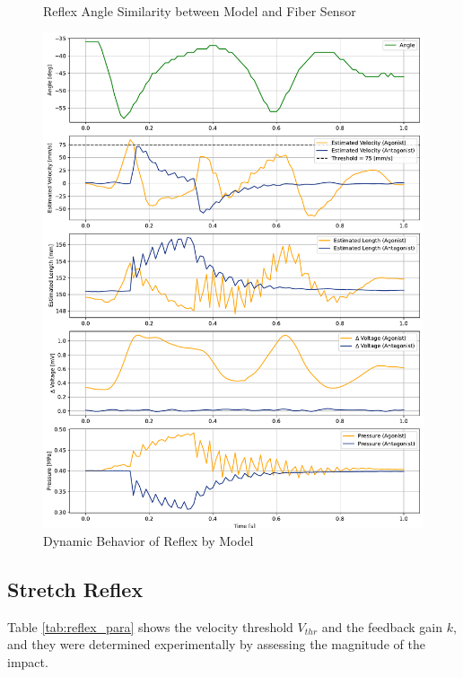 \begin{figure}[t]
\begin{minipage}[H]{\textwidth}
\begin{minipage}[H]{0.48\textwidth}
            \caption{Reflex Angle Similarity between Model and Fiber Sensor}
            \label{fig:reflex_angle}
        \end{minipage}
        \hfill
        \begin{minipage}[H]{0.48\textwidth} 
            \centering
            \includegraphics[width=\columnwidth]{fig/20240819_r20_reflex_all_plt.pdf}
            \caption{Dynamic Behavior of Reflex by Model}
            \label{fig:reflex_all}
        \end{minipage}
    \end{minipage}
\end{figure}


\subsection{Stretch Reflex}
Table \ref{tab:reflex_para} shows the velocity threshold $V_{thr}$ and the feedback gain $k$, and they were determined experimentally by assessing the magnitude of the impact. 

